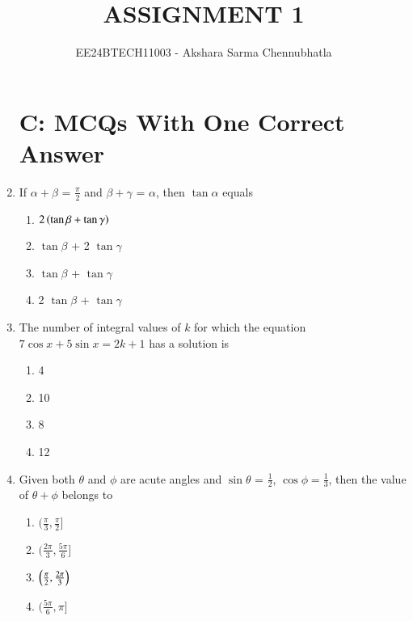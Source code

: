\documentclass[journal,12pt,twocolumn,article]{IEEEtran}
\theoremstyle{remark}
\begin{document}
\begin{enumerate}[start = 20]

\vspace{3cm}
\title{ASSIGNMENT 1}
\author{EE24BTECH11003 - Akshara Sarma Chennubhatla}
\maketitle
\newpage
\bigskip
\section*{C: MCQs With One Correct Answer}
\item If $\alpha + \beta$ = $\frac{\pi}{2}$ and $\beta + \gamma$ = $\alpha$, then $\tan \alpha$ equals
\hfill{}
\begin{multicols}{2}
\begin{enumerate}
\item $2\left(\tan \beta + \tan \gamma\right)$
\item $\tan\beta$ + 2 $\tan\gamma$
\columnbreak
\item $\tan\beta$ + $\tan\gamma$
\item 2 $\tan\beta$ + $\tan\gamma$
\end{enumerate}
\end{multicols}
\item The number of integral values of $k$ for which the equation $7\cos x + 5\sin x = 2k+1$ has a solution is
\hfill{}
\begin{multicols}{2}
\begin{enumerate}
\item 4
\item 10
\columnbreak
\item 8
\item 12 
\end{enumerate}
\end{multicols}
\item Given both $\theta$ and $\phi$ are acute angles and $\sin\theta$ = $\frac{1}{2}$, $\cos\phi = \frac{1}{3}$, then the value of $\theta + \phi$ belongs to
\hfill{}
\begin{multicols}{2}
\begin{enumerate}
\item $(\frac{\pi}{3},\frac{\pi}{2}]$
\item $(\frac{2\pi}{3},\frac{5\pi}{6}]$
\columnbreak
\item $\left(\frac{\pi}{2},\frac{2\pi}{3}\right)$
\item $(\frac{5\pi}{6},\pi]$
\end{enumerate}

\end{multicols}
\end{enumerate}
\end{document}
